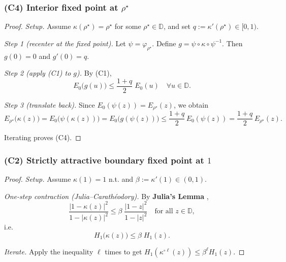 \documentclass[11pt]{article}
\begin{document}
\subsubsection{(C4) Interior fixed point at $\rho^\star$}

\begin{proof}
\textit{Setup.} Assume $\kappa(\rho^\star)=\rho^\star$ for some $\rho^\star\in\mathbb{D}$, and set $q:=\kappa'(\rho^\star)\in[0,1)$.

\textit{Step 1 (recenter at the fixed point).}
Let $\psi=\varphi_{\rho^\star}$. Define $g=\psi\circ\kappa\circ\psi^{-1}$. Then $g(0)=0$ and $g'(0)=q$.

\textit{Step 2 (apply (C1) to $g$).}
By (C1),
\begin{equation}
E_0\big(g(u)\big) \leq \frac{1+q}{2}\;E_0(u)\quad\forall u\in\mathbb{D}.
\end{equation}

\textit{Step 3 (translate back).}
Since $E_0(\psi(z))=E_{\rho^\star}(z)$, we obtain
\begin{equation}
E_{\rho^\star}\big(\kappa(z)\big) = E_0\big(\psi(\kappa(z))\big) = E_0\big(g(\psi(z))\big)
\leq \frac{1+q}{2}\,E_0(\psi(z)) = \frac{1+q}{2}\,E_{\rho^\star}(z).
\end{equation}

Iterating proves (C4).
\end{proof}

\subsubsection{(C2) Strictly attractive boundary fixed point at $1$}

\begin{proof}
\textit{Setup.} Assume $\kappa(1)=1$ n.t. and $\beta:=\kappa'(1)\in(0,1)$.

\textit{One-step contraction (Julia–Carathéodory).}
By \textbf{Julia's Lemma} \cite{julia1918,caratheodory1907},
\begin{equation}
\frac{|1-\kappa(z)|^2}{1-|\kappa(z)|^2} \leq \beta\;\frac{|1-z|^2}{1-|z|^2}
\quad\text{for all }z\in\mathbb{D},
\end{equation}
i.e.
\begin{equation}
H_1\big(\kappa(z)\big) \leq \beta\;H_1(z).
\end{equation}

\textit{Iterate.}
Apply the inequality $\ell$ times to get $H_1(\kappa^{\circ \ell}(z))\leq \beta^\ell H_1(z)$.
\end{proof}
\end{document}
